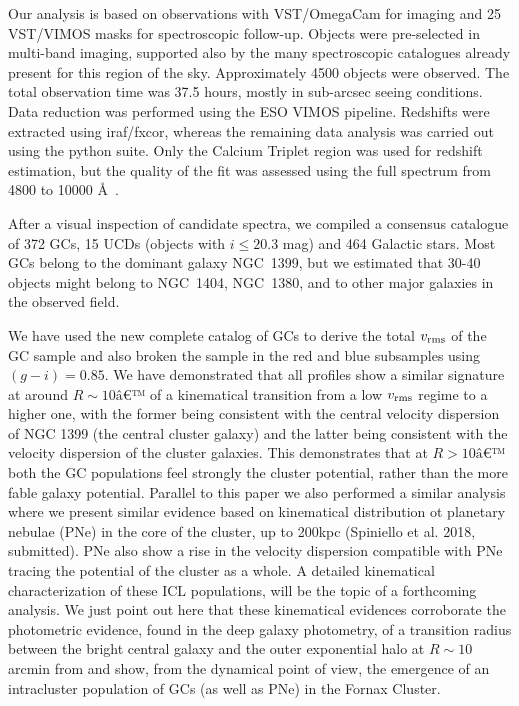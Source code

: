\documentclass[useAMS,usenatbib]{mn2e}
\begin{document}
Our analysis is based on observations with VST/OmegaCam for imaging and 25 
VST/VIMOS masks for spectroscopic follow-up. Objects were pre-selected in 
multi-band imaging, supported also by the many spectroscopic catalogues already 
present for this region of the sky.  Approximately 4500 objects were observed. 
The total observation time was 37.5 hours, mostly in sub-arcsec seeing 
conditions. Data reduction was performed using the ESO VIMOS pipeline. 
Redshifts were extracted using iraf/fxcor, whereas the remaining data analysis 
was carried out using the python suite. Only the Calcium Triplet region was 
used for redshift estimation, but the quality of the fit was assessed using the 
full spectrum from 4800 to 10000 \AA\ .

After a visual inspection of candidate spectra, we compiled a consensus 
catalogue of 372 GCs, 15 UCDs (objects with $i \le 20.3$ mag) and 464 Galactic 
stars. Most GCs belong to the dominant galaxy NGC~1399, but we estimated that 
30-40 objects might belong to NGC~1404, NGC~1380, and to other major galaxies 
in the observed field.

We have used the new complete catalog of GCs to derive the total  $v_{\rm rms}$ 
of the GC sample and also broken the sample in the red and blue subsamples using
$(g - i) = 0.85$.
We have demonstrated that all profiles show a similar signature at around 
$R\sim10â€™$ of a kinematical transition from a low $v_{\rm rms}$ regime to a 
higher one, with the former being consistent with the central velocity 
dispersion of NGC 1399 (the central cluster galaxy) and the latter being 
consistent with the velocity dispersion of the cluster galaxies. This 
demonstrates that at $R>10â€™$ both the GC populations feel strongly the cluster 
potential, rather than the more fable galaxy potential. Parallel to this paper 
we also performed a similar analysis where we present similar evidence based on 
kinematical distribution ot planetary nebulae (PNe) in the core of the cluster, 
up to 200kpc (Spiniello et al. 2018, submitted). PNe also show a rise in the 
velocity dispersion compatible with PNe tracing the potential of the cluster as 
a whole. A detailed kinematical characterization of these ICL populations, will 
be the topic of a forthcoming analysis. We just point out here that these 
kinematical evidences corroborate the photometric evidence, found in the deep 
galaxy photometry, of a transition radius between the bright central galaxy and 
the outer exponential halo at $R\sim10$ arcmin from \citet{Iodice16} and 
show, from the dynamical point of view, the emergence of an intracluster 
population of GCs (as well as PNe) in the Fornax Cluster.




\end{document}
